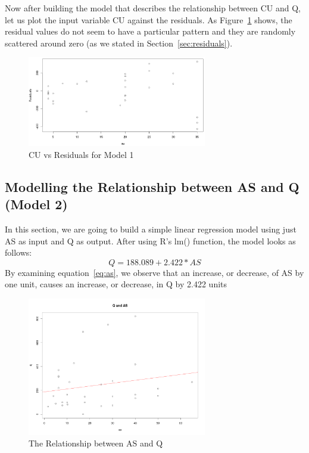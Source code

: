 \documentclass[a4paper,12pt, english]{article}
\begin{document}
Now after building the model that describes the relationship between CU and Q, let us plot the input variable CU against the residuals. As Figure~\ref{fig:mod1-resid1} shows, the residual values do not seem to have a particular pattern and they are randomly scattered around zero (as we stated in Section~\ref{sec:residuals}).
\begin{figure}[H]
  \centering
  \includegraphics[width=0.6986\textwidth]{mod1-resid1}
  \caption{CU vs Residuals for Model 1}
  \label{fig:mod1-resid1}
\end{figure}

\subsection{Modelling the Relationship between AS and Q (Model 2)} \label{sec:asmodel}
In this section, we are going to build a simple linear regression model using just AS as input and Q as output. After using R's lm() function, the model looks as follows:\\
\begin{equation}
\label{eq:as}
Q = 188.089   +     2.422*AS 
\end{equation}       
By examining equation~\ref{eq:as}, we observe that an increase, or decrease, of AS by one unit, causes an increase, or decrease, in Q by 2.422 units

\begin{figure}[H]
  \centering
  \includegraphics[width=0.6986\textwidth]{as-line}
  \caption{The Relationship between AS and Q}
  \label{fig:as-line}
\end{figure}
\end{document}
